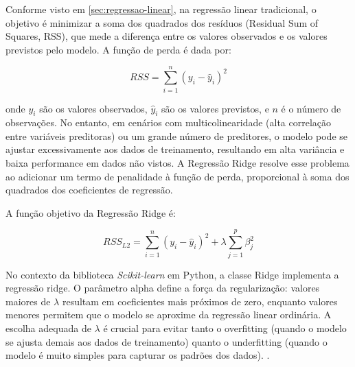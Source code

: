 Conforme visto em \ref{sec:regressao-linear}, na regressão linear tradicional, o objetivo é minimizar a soma dos quadrados dos resíduos (Residual Sum of Squares, RSS), que mede a diferença entre os valores observados e os valores previstos pelo modelo. A função de perda é dada por:

\begin{equation}
	RSS = \sum_{i=1}^{n} (y_i - \hat{y}_i)^2
\end{equation}

onde $y_i$ são os valores observados, $\hat{y}_i$ são os valores previstos, e $n$ é o número de observações. No entanto, em cenários com multicolinearidade (alta correlação entre variáveis preditoras) ou um grande número de preditores, o modelo pode se ajustar excessivamente aos dados de treinamento, resultando em alta variância e baixa performance em dados não vistos. A Regressão Ridge resolve esse problema ao adicionar um termo de penalidade à função de perda, proporcional à soma dos quadrados dos coeficientes de regressão. 

A função objetivo da Regressão Ridge é:

\begin{equation}
	RSS_{L2} = \sum_{i=1}^{n} (y_i - \hat{y}_i)^2 + \lambda \sum_{j=1}^{p} \beta_j^2
\end{equation}

No contexto da biblioteca \textit{Scikit-learn} em Python, a classe Ridge implementa a regressão ridge. O parâmetro alpha define a força da regularização: valores maiores de $\lambda$ resultam em coeficientes mais próximos de zero, enquanto valores menores permitem que o modelo se aproxime da regressão linear ordinária. A escolha adequada de 
$\lambda$ é crucial para evitar tanto o overfitting  (quando o modelo se ajusta demais aos dados de treinamento) quanto o underfitting (quando o modelo é muito simples para capturar os padrões dos dados). \cite{ScikitLearnRidge2025}.


